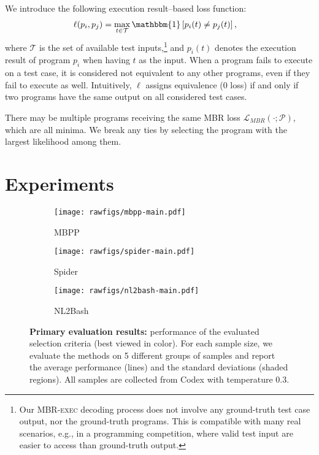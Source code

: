 \documentclass[11pt]{article}
\newcommand{\mbrexec}{\textsc{MBR-exec}\xspace}
\begin{document}
We introduce the following execution result--based loss function:
\begin{align*}
    \ell (p_i, p_j) &= \max_{t \in \mathcal{T}} \mathbbm{1}\left[p_i(t) \neq p_j(t)\right],
\end{align*}
where $\mathcal{T}$ is the set of available test inputs,\footnote{Our \mbrexec decoding process does not involve any ground-truth test case output, nor the ground-truth programs. This is compatible with many real scenarios, e.g., in a programming competition, where valid test input are easier to access than ground-truth output.} and $p_i(t)$ denotes the execution result of program $p_i$ when having $t$ as the input. When a program fails to execute on a test case, it is considered not equivalent to any other programs, even if they fail to execute as well. Intuitively, $\ell$ assigns equivalence ($0$ loss) if and only if two programs have the same output on all considered test cases.

There may be multiple programs receiving the same MBR loss $\mathcal{L}_\textit{MBR}(\cdot; \mathcal{P})$, which are all minima. We break any ties by selecting the program with the largest likelihood among them.

 \section{Experiments}
\label{sec:expr}

\begin{figure*}[t!]
    \centering
    \begin{subfigure}[t]{0.34\textwidth}
        \texttt{[image: rawfigs/mbpp-main.pdf]}
        \caption{MBPP}
    \end{subfigure}
    \hspace{-10pt}
    \begin{subfigure}[t]{0.34\textwidth}
        \texttt{[image: rawfigs/spider-main.pdf]}
        \caption{Spider}
    \end{subfigure}
    \hspace{-10pt}
    \begin{subfigure}[t]{0.34\textwidth}
        \texttt{[image: rawfigs/nl2bash-main.pdf]}
        \caption{NL2Bash}
    \end{subfigure}
    \caption{\textbf{Primary evaluation results:} performance of the evaluated selection criteria (best viewed in color). For each sample size, we evaluate the methods on 5 different groups of samples and report the average performance (lines) and the standard deviations (shaded regions). All samples are collected from Codex with temperature 0.3. }
    \label{fig:main-results}
\end{figure*}
\end{document}
